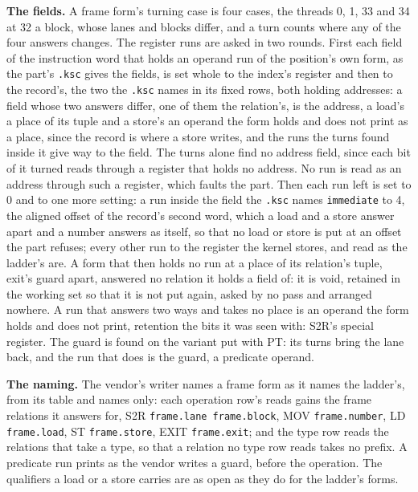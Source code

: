 \textbf{The fields.} A frame form's turning case is four cases, the threads 0, 1, 33 and 34 at 32 a block, whose lanes and blocks differ, and a turn counts where any of the four answers changes. The register runs are asked in two rounds. First each field of the instruction word that holds an operand run of the position's own form, as the part's \texttt{.\allowbreak{}ksc} gives the fields, is set whole to the index's register and then to the record's, the two the \texttt{.\allowbreak{}ksc} names in its fixed rows, both holding addresses: a field whose two answers differ, one of them the relation's, is the address, a load's a place of its tuple and a store's an operand the form holds and does not print as a place, since the record is where a store writes, and the runs the turns found inside it give way to the field. The turns alone find no address field, since each bit of it turned reads through a register that holds no address. No run is read as an address through such a register, which faults the part. Then each run left is set to 0 and to one more setting: a run inside the field the \texttt{.\allowbreak{}ksc} names \texttt{immediate} to 4, the aligned offset of the record's second word, which a load and a store answer apart and a number answers as itself, so that no load or store is put at an offset the part refuses; every other run to the register the kernel stores, and read as the ladder's are. A form that then holds no run at a place of its relation's tuple, exit's guard apart, answered no relation it holds a field of: it is void, retained in the working set so that it is not put again, asked by no pass and arranged nowhere. A run that answers two ways and takes no place is an operand the form holds and does not print, retention the bits it was seen with: S2R's special register. The guard is found on the variant put with PT: its turns bring the lane back, and the run that does is the guard, a predicate operand.

\textbf{The naming.} The vendor's writer names a frame form as it names the ladder's, from its table and names only: each operation row's reads gains the frame relations it answers for, S2R \texttt{frame.\allowbreak{}lane frame.\allowbreak{}block}, MOV \texttt{frame.\allowbreak{}number}, LD \texttt{frame.\allowbreak{}load}, ST \texttt{frame.\allowbreak{}store}, EXIT \texttt{frame.\allowbreak{}exit}; and the type row reads the relations that take a type, so that a relation no type row reads takes no prefix. A predicate run prints as the vendor writes a guard, before the operation. The qualifiers a load or a store carries are as open as they do for the ladder's forms.

